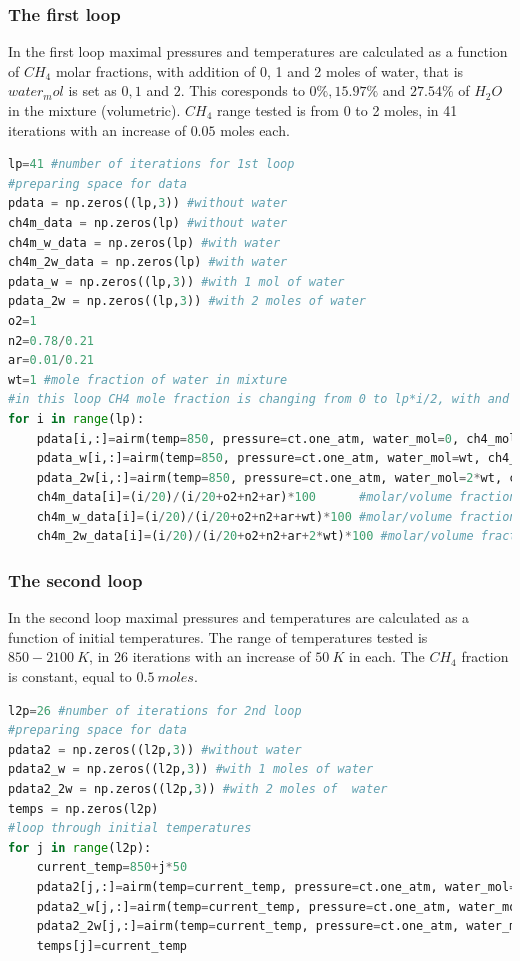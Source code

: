 \documentclass[a4paper]{article}
\begin{document}
\subsubsection{The first loop}
In the first loop maximal pressures and temperatures are calculated as a function of $CH_4$ molar fractions,  with addition of 0, 1 and 2 moles of water, that is $water_mol$ is set as $0, 1$ and $2$. This coresponds to $0\%, 15.97\%$ and $27.54\%$ of $H_2O$ in the mixture (volumetric). $CH_4$ range tested is from 0 to 2 moles, in 41 iterations with an increase of $0.05$ moles each.
\begin{lstlisting}[language=python]
lp=41 #number of iterations for 1st loop
#preparing space for data
pdata = np.zeros((lp,3)) #without water
ch4m_data = np.zeros(lp) #without water
ch4m_w_data = np.zeros(lp) #with water
ch4m_2w_data = np.zeros(lp) #with water
pdata_w = np.zeros((lp,3)) #with 1 mol of water
pdata_2w = np.zeros((lp,3)) #with 2 moles of water
o2=1 
n2=0.78/0.21
ar=0.01/0.21
wt=1 #mole fraction of water in mixture
#in this loop CH4 mole fraction is changing from 0 to lp*i/2, with and without addition of water
for i in range(lp):
    pdata[i,:]=airm(temp=850, pressure=ct.one_atm, water_mol=0, ch4_mol=i/2, plot=0) #without water
    pdata_w[i,:]=airm(temp=850, pressure=ct.one_atm, water_mol=wt, ch4_mol=i/2, plot=0) #with water
    pdata_2w[i,:]=airm(temp=850, pressure=ct.one_atm, water_mol=2*wt, ch4_mol=i/2, plot=0) #with water
    ch4m_data[i]=(i/20)/(i/20+o2+n2+ar)*100      #molar/volume fraction of CH4 in mixture, when there is no water
    ch4m_w_data[i]=(i/20)/(i/20+o2+n2+ar+wt)*100 #molar/volume fraction of CH4 in mixture, when there is 1 mole water
    ch4m_2w_data[i]=(i/20)/(i/20+o2+n2+ar+2*wt)*100 #molar/volume fraction of CH4 in mixture, when there are 2 moles of water
\end{lstlisting}
\subsubsection{The second loop}
In the second loop maximal pressures and temperatures are calculated as a function of initial temperatures. The range of temperatures tested is $850-2100\ K$, in 26 iterations with an increase of $50\ K$ in each. The $CH_4$ fraction is constant, equal to $0.5\ moles$.
\begin{lstlisting}[language=python]
l2p=26 #number of iterations for 2nd loop
#preparing space for data
pdata2 = np.zeros((l2p,3)) #without water
pdata2_w = np.zeros((l2p,3)) #with 1 moles of water
pdata2_2w = np.zeros((l2p,3)) #with 2 moles of  water
temps = np.zeros(l2p)
#loop through initial temperatures
for j in range(l2p):
    current_temp=850+j*50
    pdata2[j,:]=airm(temp=current_temp, pressure=ct.one_atm, water_mol=0, ch4_mol=5, plot=0)
    pdata2_w[j,:]=airm(temp=current_temp, pressure=ct.one_atm, water_mol=wt, ch4_mol=5, plot=0)
    pdata2_2w[j,:]=airm(temp=current_temp, pressure=ct.one_atm, water_mol=2*wt, ch4_mol=5, plot=0)
    temps[j]=current_temp
\end{lstlisting}
\end{document}
